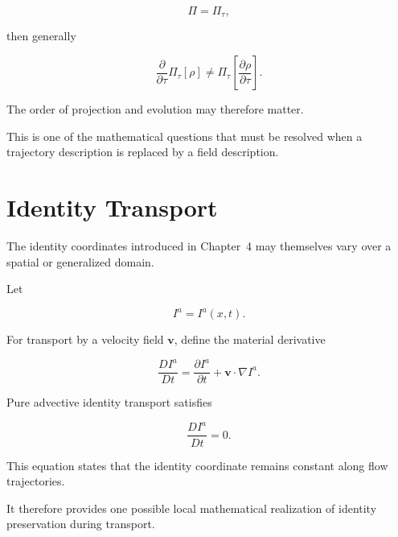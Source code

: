 \documentclass[12pt,oneside]{book}
\begin{document}
\begin{equation}
    \Pi
    =
    \Pi_\tau,
\end{equation}

then generally

\begin{equation}
    \frac{\partial}{\partial\tau}
    \Pi_\tau[\rho]
    \neq
    \Pi_\tau
    \left[
        \frac{\partial\rho}{\partial\tau}
    \right].
    \label{eq:projection-time-noncommutation}
\end{equation}

The order of projection and evolution may therefore matter.

This is one of the mathematical questions that must be resolved
when a trajectory description is replaced by a field
description.


\section{Identity Transport}
\label{sec:identity-transport}

The identity coordinates introduced in Chapter~4 may themselves
vary over a spatial or generalized domain.

Let

\begin{equation}
    I^a
    =
    I^a(x,t).
    \label{eq:identity-field}
\end{equation}

For transport by a velocity field \(\mathbf{v}\), define the
material derivative

\begin{equation}
    \frac{D I^a}{Dt}
    =
    \frac{\partial I^a}{\partial t}
    +
    \mathbf{v}\cdot\nabla I^a.
    \label{eq:identity-material-derivative}
\end{equation}

Pure advective identity transport satisfies

\begin{equation}
    \frac{D I^a}{Dt}
    =
    0.
    \label{eq:pure-identity-advection}
\end{equation}

This equation states that the identity coordinate remains
constant along flow trajectories.

It therefore provides one possible local mathematical
realization of identity preservation during transport.
\end{document}
